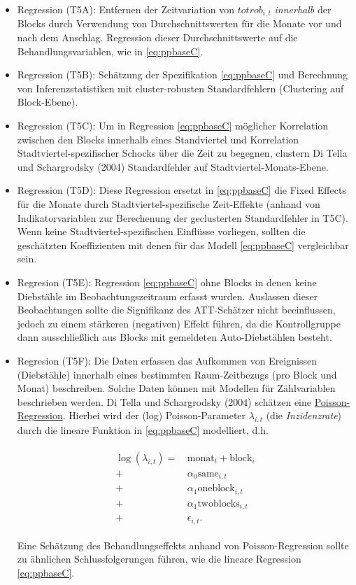 \documentclass[
  a4paper,
  DIV=11,
  oneside]{scrreprt}
\begin{document}
\begin{itemize}
\item
  Regression (T5A): Entfernen der Zeitvariation von
  \(\textit{totrob}_{i,t}\) \emph{innerhalb} der Blocks durch Verwendung
  von Durchschnittswerten für die Monate vor und nach dem Anschlag.
  Regression dieser Durchschnittswerte auf die Behandlungsvariablen, wie
  in \eqref{eq:ppbaseC}.
\item
  Regression (T5B): Schätzung der Spezifikation \eqref{eq:ppbaseC} und
  Berechnung von Inferenzstatistiken mit cluster-robusten
  Standardfehlern (Clustering auf Block-Ebene).
\item
  Regression (T5C): Um in Regression \eqref{eq:ppbaseC} möglicher
  Korrelation zwischen den Blocks innerhalb eines Standviertel und
  Korrelation Stadtviertel-spezifischer Schocks über die Zeit zu
  begegnen, clustern Di Tella und Schargrodsky (2004) Standardfehler auf
  Stadtviertel-Monats-Ebene.
\item
  Regression (T5D): Diese Regression ersetzt in \eqref{eq:ppbaseC} die
  Fixed Effects für die Monate durch Stadtviertel-spezifische
  Zeit-Effekte (anhand von Indikatorvariablen zur Berechenung der
  geclusterten Standardfehler in T5C). Wenn keine
  Stadtviertel-spezifischen Einflüsse vorliegen, sollten die geschätzten
  Koeffizienten mit denen für das Modell \eqref{eq:ppbaseC} vergleichbar
  sein.
\item
  Regresion (T5E): Regression \eqref{eq:ppbaseC} ohne Blocks in denen
  keine Diebstähle im Beobachtungszeitraum erfasst wurden. Auslassen
  dieser Beobachtungen sollte die Signifikanz des ATT-Schätzer nicht
  beeinflussen, jedoch zu einem stärkeren (negativen) Effekt führen, da
  die Kontrollgruppe dann ausschließlich aus Blocks mit gemeldeten
  Auto-Diebstählen besteht.
\item
  Regresion (T5F): Die Daten erfassen das Aufkommen von Ereignissen
  (Diebstähle) innerhalb eines bestimmten Raum-Zeitbezugs (pro Block und
  Monat) beschreiben. Solche Daten können mit Modellen für Zählvariablen
  beschrieben werden. Di Tella und Schargrodsky (2004) schätzen eine
  \href{sec-poissonreg}{Poisson-Regression}. Hierbei wird der (log)
  Poisson-Parameter \(\lambda_{i,t}\) (die \emph{Inzidenzrate}) durch
  die lineare Funktion in \eqref{eq:ppbaseC} modelliert, d.h.

  \begin{align}
    \begin{split}
      \log(\lambda_{i,t}) 
        =&\, \text{monat}_t + \text{block}_i \\
        + &\, \alpha_0 \text{same}_{i,t} \\
        + &\, \alpha_1 \text{oneblock}_{i,t} \\
        + &\, \alpha_1 \text{twoblocks}_{i,t} \\
        + &\, \epsilon_{i,t}.
      \end{split}\label{eq:pppois}
    \end{align}

  Eine Schätzung des Behandlungseffekts anhand von Poisson-Regression
  sollte zu ähnlichen Schlussfolgerungen führen, wie die lineare
  Regression \eqref{eq:ppbaseC}.
\end{itemize}
\end{document}
